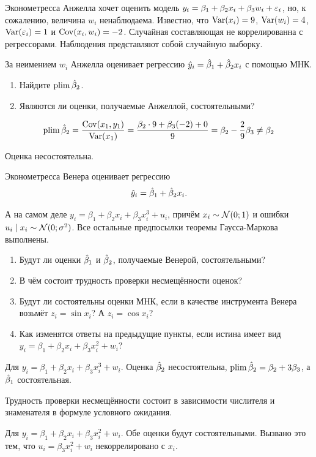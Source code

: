 \begin{problem}
Эконометресса Анжелла хочет оценить модель $y_i=\beta_1+\beta_2 x_i +\beta_3 w_i +\varepsilon_i$, но, 
к сожалению, величина $w_i$ ненаблюдаема. Известно, что $\operatorname{Var}(x_i)=9$, $\operatorname{Var}(w_i)=4$,  $\operatorname{Var}(\varepsilon_i)=1$ и $\operatorname{Cov}(x_i,w_i)=-2$. 
Случайная составляющая не коррелированна с регрессорами.
Наблюдения представляют собой случайную выборку.

За неимением $w_i$ Анжелла оценивает регрессию $\hat{y}_i=\hat{\beta}_1+\hat{\beta}_2 x_i$ с помощью МНК.

\begin{enumerate}
\item Найдите $\operatorname*{plim} \hat{\beta}_2$.
\item Являются ли оценки, получаемые Анжеллой, состоятельными?
\end{enumerate}



\begin{sol}
\[
\operatorname*{plim} \hat{\beta}_2 = \frac{\operatorname{Cov}(x_1, y_1)}{\operatorname{Var}(x_1)} = \frac{\beta_2 \cdot 9 + \beta_3 (-2) + 0}{9} = \beta_2 -\frac{2}{9} \beta_3 \neq \beta_2
\]

Оценка несостоятельна.
\end{sol}
\end{problem}






\begin{problem}
  Эконометресса Венера оценивает регрессию
  \[
    \hat{y}_i = \hat{\beta}_1 + \hat{\beta}_2 x_i. 
  \]

  А на самом деле $y_i = \beta_1 + \beta_2 x_i + \beta_3 x_i^3 + u_i$, причём $x_i \sim \mathcal{N} (0; 1)$ и ошибки $u_i \mid x_i \sim \mathcal{N}(0; \sigma^2)$. 
  Все остальные предпосылки теоремы Гаусса-Маркова выполнены.

  \begin{enumerate}
     \item Будут ли оценки $\hat{\beta}_1$ и $\hat{\beta}_2$, получаемые Венерой, состоятельными?
    \item В чём состоит трудность проверки несмещённости оценок?
    \item Будут ли состоятельны оценки МНК, если в качестве инструмента Венера возьмёт $z_i = \sin x_i$?
    А $z_i = \cos x_i$?
    \item Как изменятся ответы на предыдущие пункты, если истина имеет вид  $y_i = \beta_1 + \beta_2 x_i + \beta_3 x_i^2 + w_i$?
  \end{enumerate}

\begin{sol}
  Для $y_i = \beta_1 + \beta_2 x_i + \beta_3 x_i^3 + w_i$.
  Оценка $\hat{\beta}_2$ несостоятельна, $\operatorname*{plim} \hat{\beta}_2 = \beta_2 + 3\beta_3$, а $\hat{\beta}_1$ состоятельная.

  Трудность проверки несмещённости состоит в зависимости числителя и знаменателя в
  формуле условного ожидания.

  Для $y_i = \beta_1 + \beta_2 x_i + \beta_3 x_i^2 + w_i$.
  Обе оценки будут состоятельными. Вызвано это тем, что $u_i = \beta_3 x_i^2 + w_i$ некоррелировано с $x_i$.
\end{sol}
\end{problem}

